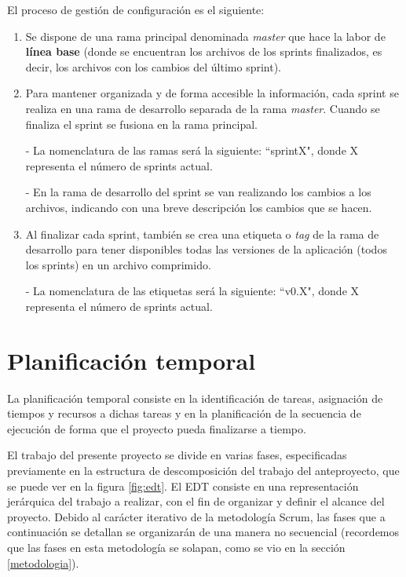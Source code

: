 \noindent
El proceso de gestión de configuración es el siguiente:
\begin{enumerate}
\item Se dispone de una rama principal denominada \textit{master} que hace la labor de \textbf{línea base} (donde se encuentran los archivos de los sprints finalizados, es decir, los archivos con los cambios del último sprint).
\item Para mantener organizada y de forma accesible la información, cada sprint se realiza en una rama de desarrollo separada de la rama \textit{master}. Cuando se finaliza el sprint se fusiona en la rama principal.

- La nomenclatura de las ramas será la siguiente: ``sprintX", donde X representa el número de sprints actual.

- En la rama de desarrollo del sprint se van realizando los cambios a los archivos, indicando con una breve descripción los cambios que se hacen.
\item Al finalizar cada sprint, también se crea una etiqueta o \textit{tag} de la rama de desarrollo para tener disponibles todas las versiones de la aplicación (todos los sprints) en un archivo comprimido.

- La nomenclatura de las etiquetas será la siguiente: ``v0.X", donde X representa el número de sprints actual.
\end{enumerate}

\section{Planificación temporal}
La planificación temporal consiste en la identificación de tareas, asignación de tiempos y recursos a dichas tareas y en la planificación de la secuencia de ejecución de forma que el proyecto pueda finalizarse a tiempo. 

El trabajo del presente proyecto se divide en varias fases, especificadas previamente en la estructura de descomposición del trabajo del anteproyecto, que se puede ver en la figura \ref{fig:edt}. El EDT consiste en una representación jerárquica del trabajo a realizar, con el fin de organizar y definir el alcance del proyecto. Debido al carácter iterativo de la metodología Scrum, las fases que a continuación se detallan se organizarán de una manera no secuencial (recordemos que las fases en esta metodología se solapan, como se vio en la sección \ref{metodologia}).

